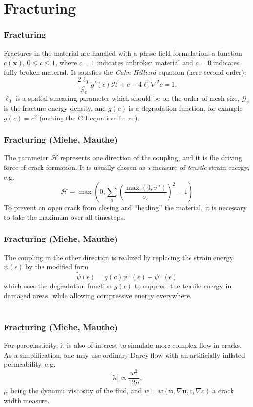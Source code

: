 \documentclass{beamer}
\begin{document}
\section{Fracturing}

\begin{frame}
  \frametitle{Fracturing}

  Fractures in the material are handled with a phase field formulation: a
  function $c(\bm x)$, $0 \leq c \leq 1$, where $c=1$ indicates unbroken
  material and $c=0$ indicates fully broken material. It satisfies the
  \emph{Cahn-Hilliard} equation (here second order):
  \[
    \frac{2 \ell_0}{\mathcal{G}_\text{c}} g'(c) \mathcal{H}
    + c - 4 \ell_0^2 \nabla^2 c = 1.
  \]
  $\ell_0$ is a spatial smearing parameter which should be on the order of mesh
  size, $\mathcal{G}_\text{c}$ is the fracture energy density, and $g(c)$ is a
  degradation function, for example $g(c) = c^2$ (making the CH-equation linear).
\end{frame}

\begin{frame}
  \frametitle{Fracturing (Miehe, Mauthe)}

  The parameter $\mathcal{H}$ represents one direction of the coupling, and it
  is the driving force of crack formation. It is usually chosen as a measure of
  \emph{tensile} strain energy, e.g.
  \[
    \mathcal{H} = \max \left(
      0, \sum_{a} \left( \frac{\max(0, \sigma^a)}{\sigma_c} \right)^2 - 1
    \right)
  \]
  To prevent an open crack from closing and ``healing'' the material, it is
  necessary to take the maximum over all timesteps.
\end{frame}

\begin{frame}
  \frametitle{Fracturing (Miehe, Mauthe)}

  The coupling in the other direction is realized by replacing the strain energy
  $\psi(\epsilon)$ by the modified form
  \[
    \tilde{\psi}(\epsilon) = g(c) \psi^+(\epsilon) + \psi^-(\epsilon)
  \]
  which uses the degradation function $g(c)$ to suppress the tensile energy in
  damaged areas, while allowing compressive energy everywhere. \\~\\
\end{frame}

\begin{frame}
  \frametitle{Fracturing (Miehe, Mauthe)}

  For poroelasticity, it is also of interest to simulate more complex flow in
  cracks. As a simplification, one may use ordinary Darcy flow with an
  artificially inflated permeability, e.g.
  \[
    |\tilde{\kappa}| \propto \frac{w^2}{12\mu},
  \]
  $\mu$ being the dynamic viscosity of the flud, and
  $w = w(\bm u, \nabla \bm u, c, \nabla c)$ a crack width measure.
\end{frame}
\end{document}

